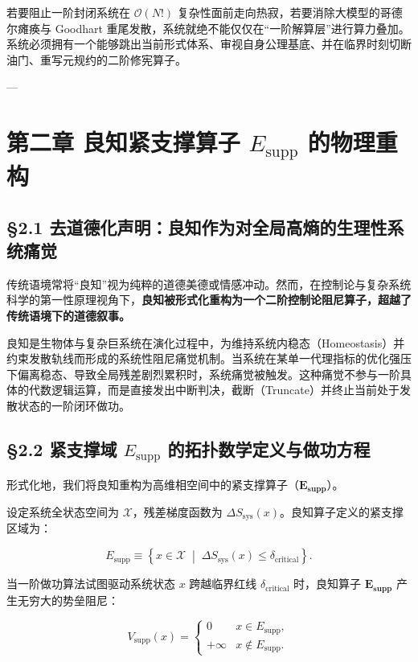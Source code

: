 \documentclass[11pt,a4paper,oneside]{ctexart}
\begin{document}
若要阻止一阶封闭系统在 $\mathcal{O}(N!)$ 复杂性面前走向热寂，若要消除大模型的哥德尔瘫痪与 Goodhart 重尾发散，系统就绝不能仅仅在“一阶解算层”进行算力叠加。系统必须拥有一个能够跳出当前形式体系、审视自身公理基底、并在临界时刻切断油门、重写元规约的二阶修宪算子。


---


\section{第二章 良知紧支撑算子 \texorpdfstring{$E_{\text{supp}}$}{E\_supp} 的物理重构}

\subsection{§2.1 去道德化声明：良知作为对全局高熵的生理性系统痛觉}

传统语境常将“良知”视为纯粹的道德美德或情感冲动。然而，在控制论与复杂系统科学的第一性原理视角下，\textbf{良知被形式化重构为一个二阶控制论阻尼算子，超越了传统语境下的道德叙事。}


良知是生物体与复杂巨系统在演化过程中，为维持系统内稳态（Homeostasis）并约束发散轨线而形成的系统性阻尼痛觉机制。当系统在某单一代理指标的优化强压下偏离稳态、导致全局残差剧烈累积时，系统痛觉被触发。这种痛觉不参与一阶具体的代数逻辑运算，而是直接发出中断判决，截断（Truncate）并终止当前处于发散状态的一阶闭环做功。


\subsection{§2.2 紧支撑域 \texorpdfstring{$E_{\text{supp}}$}{E\_supp} 的拓扑数学定义与做功方程}

形式化地，我们将良知重构为高维相空间中的\textit{}紧支撑算子（$\mathbf{E_{\text{supp}}}$）\textit{}。


设定系统全状态空间为 $\mathcal{X}$，残差梯度函数为 $\Delta S_{\text{sys}}(x)$。良知算子定义的紧支撑区域为：


\begin{equation}
E_{\text{supp}} \equiv \left\{ x \in \mathcal{X} \;\middle|\; \Delta S_{\text{sys}}(x) \le \delta_{\text{critical}} \right\}.
\end{equation}

当一阶做功算法试图驱动系统状态 $x$ 跨越临界红线 $\delta_{\text{critical}}$ 时，良知算子 $\mathbf{E_{\text{supp}}}$ 产生无穷大的势垒阻尼：


\begin{equation}
V_{\text{supp}}(x) = \begin{cases} 0 & x \in E_{\text{supp}}, \\ +\infty & x \notin E_{\text{supp}}. \end{cases}
\end{equation}
\end{document}
